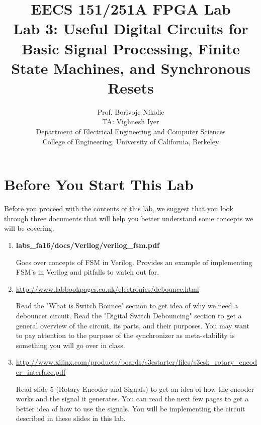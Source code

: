 \documentclass[11pt]{article}
\begin{document}
\title{EECS 151/251A FPGA Lab\\
Lab 3: Useful Digital Circuits for Basic Signal Processing, Finite State Machines, and Synchronous Resets}

\author{Prof. Borivoje Nikolic \\
TA: Vighnesh Iyer \\Department of Electrical Engineering and Computer Sciences\\
College of Engineering, University of California, Berkeley}
\date{}
\maketitle

\tableofcontents

\section{Before You Start This Lab}

Before you proceed with the contents of this lab, we suggest that you look through three documents that will help you better understand some concepts we will be covering.

\begin{enumerate}
	\item \textbf{labs\_fa16/docs/Verilog/verilog\_fsm.pdf}
	
	Goes over concepts of FSM in Verilog. Provides an example of  implementing FSM's in Verilog and pitfalls to watch out for.
	
	\item \url{http://www.labbookpages.co.uk/electronics/debounce.html}
	
	Read the "What is Switch Bounce" section to get idea of why we need a debouncer circuit. Read the "Digital Switch Debouncing" section to get a general overview of the circuit, its parts, and their purposes. You may want to pay attention to the purpose of the synchronizer as meta-stability is something you will go over in class.
	
	\item \url{http://www.xilinx.com/products/boards/s3estarter/files/s3esk_rotary_encoder_interface.pdf}
	
	Read slide 5 (Rotary Encoder and Signals) to get an idea of how the encoder works and the signal it generates. You can read the next few pages to get a better idea of how to use the signals. You will be implementing the circuit described in these slides in this lab.

\end{enumerate}
\end{document}
